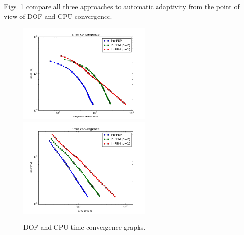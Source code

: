 Figs. \ref{fig:nist-7-conv} compare all
three approaches to automatic adaptivity from the point
of view of DOF and CPU convergence.

\begin{figure}[!ht]
\centering
\includegraphics[height=5cm]{nist/nist-7/conv_dof_aniso.png}\ \
\includegraphics[height=5cm]{nist/nist-7/conv_cpu_aniso.png}
\caption{DOF and CPU time convergence graphs.}
\label{fig:nist-7-conv}
\end{figure}

